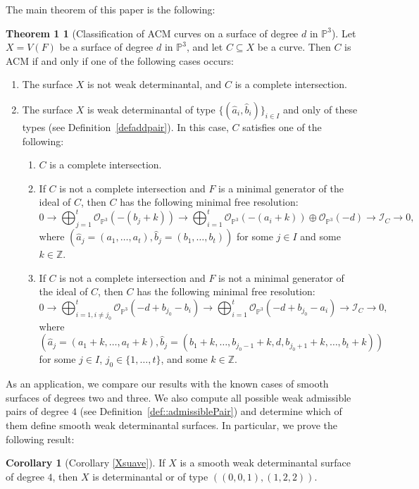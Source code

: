 \documentclass[12pt,reqno]{amsart}
\theoremstyle{plain}
\theoremstyle{definition}
\theoremstyle{remark}
\theoremstyle{definition}
\newtheorem*{thm1}{Theorem 1}
\newtheorem*{coro}{Corollary}
\newcommand{\PP}{\mathds{P}}
\newcommand{\PPP}{\PP^{3}}
\newcommand{\ii}{\mathscr{I}}
\newcommand{\oo}{\mathcal{O}}
\begin{document}
The main theorem of this paper is the following:
\begin{thm1}[Classification of ACM curves on a surface of degree $d$ in $\PPP$] \label{teoprinc}
Let $X=V(F)$ be a surface of degree $d$ in $\PPP$, and let $C\subseteq X$ be a curve. Then $C$ is ACM if and only if one of the following cases occurs:
\begin{enumerate}
    \item The surface $X$ is not weak determinantal, and $C$ is a complete intersection.

    \item The surface $X$ is weak determinantal of type $\{(\hat{a}_{i},\hat{b}_{i})\}_{i\in I}$ and only of these types (see Definition~\ref{defaddpair}). In this case, $C$ satisfies one of the following:
    \begin{enumerate}[label=(\roman*)]
        \item $C$ is a complete intersection.
        \item If $C$ is not a complete intersection and $F$ is a minimal generator of the ideal of $C$, then $C$ has the following minimal free resolution:
        $$0\to \bigoplus_{j=1}^{t}\oo_{\PPP}(-(b_{j}+k))\to \bigoplus_{i=1}^{t}\oo_{\PPP}(-(a_{i}+k))\oplus \oo_{\PPP}(-d)\to \ii_{C}\to 0,$$
        where $(\hat{a}_{j}=(a_{1},\ldots ,a_{t}),\hat{b}_{j}=(b_{1},\ldots ,b_{t}))$ for some $j\in I$ and some $k\in\mathds{Z}$.
        \item If $C$ is not a complete intersection and $F$ is not a minimal generator of the ideal of $C$, then $C$ has the following minimal free resolution:
        $$0\to \bigoplus_{i=1,i\neq j_{0}}^{t}\oo_{\PPP}(-d+b_{j_{0}}-b_{i})\to \bigoplus_{i=1}^{t}\oo_{\PPP}(-d+b_{j_{0}}-a_{i})\to \ii_{C}\to 0,$$
        where $(\hat{a}_{j}=(a_{1}+k,\ldots ,a_{t}+k),\hat{b}_{j}=(b_{1}+k,\ldots ,b_{j_{0}-1}+k,d,b_{j_{0}+1}+k,\ldots ,b_{t}+k))$ for some $j\in I$, $j_{0}\in\{1,\ldots ,t\}$, and some $k\in\mathds{Z}$.
    \end{enumerate}
\end{enumerate}
\end{thm1}

As an application, we compare our results with the known cases of smooth surfaces of degrees two and three. We also compute all possible weak admissible pairs of degree $4$ (see Definition~\ref{def::admissiblePair}) and determine which of them define smooth weak determinantal surfaces. In particular, we prove the following result:
\begin{coro}[Corollary \ref{Xsuave}]
If $X$ is a smooth weak determinantal surface of degree $4$, then $X$ is determinantal or of type $((0,0,1),(1,2,2))$.
\end{coro}
\end{document}
